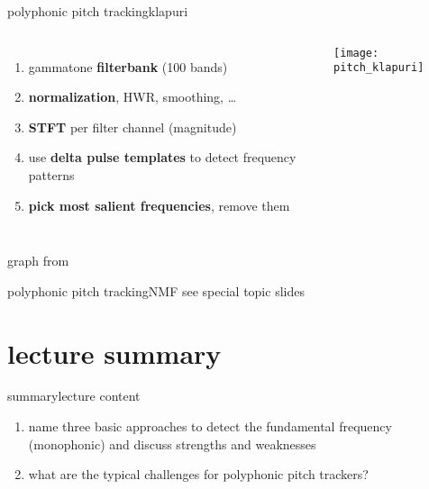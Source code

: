	\begin{frame}{polyphonic pitch tracking}{klapuri}
        \begin{columns}[T]
                \begin{enumerate}
                    \item	gammatone \textbf{filterbank} (100 bands)
                    \item<2->	\textbf{normalization}, HWR, smoothing, \ldots
                    \item<3->	\textbf{STFT} per filter channel (magnitude)
                    \item<4->	use \textbf{delta pulse templates} to detect frequency patterns
                    \item<5->	\textbf{pick most salient frequencies}, remove them
                \end{enumerate}
                \texttt{[image: pitch\_klapuri]}
        \end{columns}
    \bigskip
    
    \begin{flushright}
        graph from 
    \end{flushright}
	\end{frame}
    
	\begin{frame}{polyphonic pitch tracking}{NMF}
        see special topic slides
	\end{frame}
            
   \section[summary]{lecture summary}
        \begin{frame}{summary}{lecture content}
            \begin{enumerate}
                \item    name three basic approaches to detect the fundamental frequency (monophonic) and discuss strengths and weaknesses
                \smallskip
                \item<2->  what are the typical challenges for polyphonic pitch trackers?
            \end{enumerate}
        \end{frame}


